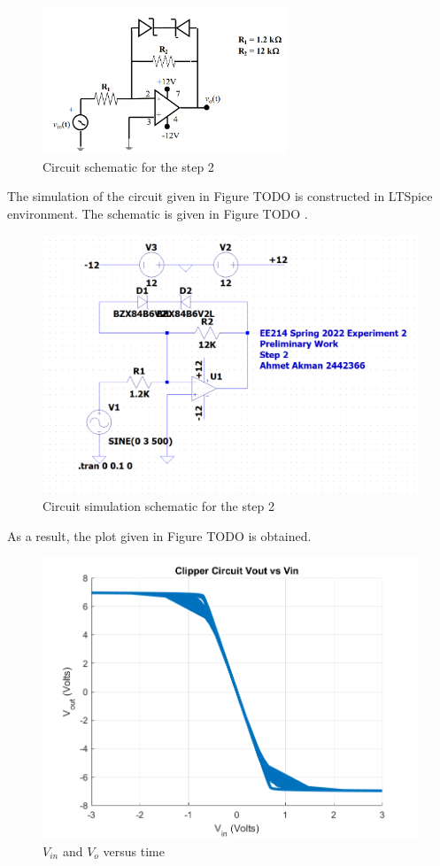 \documentclass[letterpaper,12pt]{article}
\begin{document}
\begin{figure}[H]
    \centering
    \includegraphics[width=0.65\textwidth]{2SCH.png}
\caption{Circuit schematic for the step 2}
\end{figure} 

The simulation of the circuit given in Figure TODO is constructed in LTSpice environment. The schematic is given in Figure TODO .
\begin{figure}[H]
    \centering
    \includegraphics[width=1\textwidth]{2Sim.png}
\caption{Circuit simulation schematic  for the step 2}
\end{figure} 
As a result, the plot given in Figure TODO is obtained.
\begin{figure}[H]
    \centering
    \includegraphics[width=1\textwidth]{2.png}
\caption{\(V_{in}\) and \(V_o\) versus time} 
\end{figure} 
\end{document}
